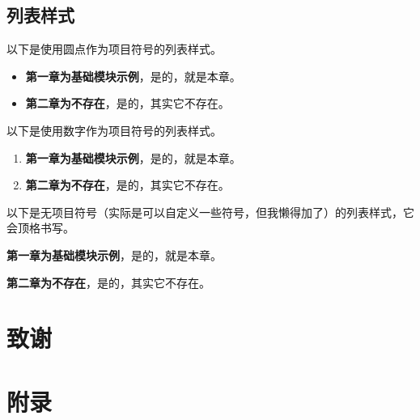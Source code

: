 \documentclass[a4paper,AutoFakeBold,oneside,12pt]{book}
\begin{document}
\section{列表样式}

以下是使用圆点作为项目符号的列表样式。

\begin{itemize}
\item \textbf{第一章为基础模块示例}，是的，就是本章。
\item \textbf{第二章为不存在}，是的，其实它不存在。
\end{itemize}

以下是使用数字作为项目符号的列表样式。

\begin{enumerate}
\item \textbf{第一章为基础模块示例}，是的，就是本章。
\item \textbf{第二章为不存在}，是的，其实它不存在。
\end{enumerate}

以下是无项目符号（实际是可以自定义一些符号，但我懒得加了）的列表样式，它会顶格书写。

\begin{description}
\item \textbf{第一章为基础模块示例}，是的，就是本章。
\item \textbf{第二章为不存在}，是的，其实它不存在。
\end{description}

\clearpage{}


\clearpage{}
\chapter*{致\qquad{}谢}
\normalsize\thankwords

\setcounter{figure}{0} 
\renewcommand{\thefigure}{~附-\arabic{figure}~}
\setcounter{equation}{0} 
\renewcommand{\theequation}{~附-\arabic{equation}~}
\setcounter{table}{0} 
\renewcommand{\thetable}{~附-\arabic{table}~}

\chapter*{附\qquad{}录}
\end{document}

